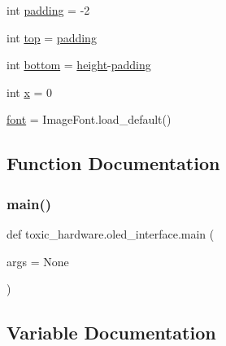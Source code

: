 \begin{DoxyCompactItemize}
int \mbox{\hyperlink{namespacetoxic__hardware_1_1oled__interface_a78dca952886227190969e885fbdd4fb4}{padding}} = -\/2
\item 
int \mbox{\hyperlink{namespacetoxic__hardware_1_1oled__interface_af93f4f37fc2ad9c37af4a715423b110c}{top}} = \mbox{\hyperlink{namespacetoxic__hardware_1_1oled__interface_a78dca952886227190969e885fbdd4fb4}{padding}}
\item 
int \mbox{\hyperlink{namespacetoxic__hardware_1_1oled__interface_a323a7064fba6e15e3e542e34fb19764e}{bottom}} = \mbox{\hyperlink{namespacetoxic__hardware_1_1oled__interface_a509290c21d570ff479c1b9d9b1fe8810}{height}}-\/\mbox{\hyperlink{namespacetoxic__hardware_1_1oled__interface_a78dca952886227190969e885fbdd4fb4}{padding}}
\item 
int \mbox{\hyperlink{namespacetoxic__hardware_1_1oled__interface_a6150e0515f7202e2fb518f7206ed97dc}{x}} = 0
\item 
\mbox{\hyperlink{namespacetoxic__hardware_1_1oled__interface_af18bb9025627467c42857f6b57902a47}{font}} = Image\+Font.\+load\+\_\+default()
\end{DoxyCompactItemize}


\subsection{Function Documentation}
\mbox{\label{namespacetoxic__hardware_1_1oled__interface_accb1149d5c8c645c307fcb16452ac121}} 
\subsubsection{\texorpdfstring{main()}{main()}}
{\footnotesize\ttfamily def toxic\+\_\+hardware.\+oled\+\_\+interface.\+main (\begin{DoxyParamCaption}\item[{}]{args = {\ttfamily None} }\end{DoxyParamCaption})}



\subsection{Variable Documentation}
\mbox{\label{namespacetoxic__hardware_1_1oled__interface_a323a7064fba6e15e3e542e34fb19764e}} 
